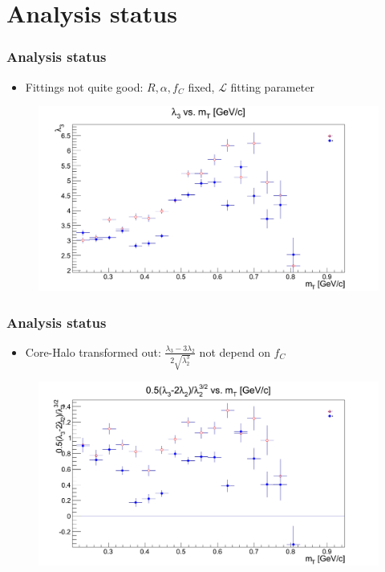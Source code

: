 \documentclass{beamer}
\begin{document}
\section{Analysis status}

\begin{frame}
\frametitle{Analysis status}
\begin{itemize}
\item Fittings not quite good: $R, \alpha, f_C$ fixed, $\mathcal{L}$ fitting parameter
\end{itemize}
\begin{figure}
\includegraphics[scale=0.27]{pic/l3}
\end{figure}
\end{frame}

\begin{frame}
\frametitle{Analysis status}
\begin{itemize}
\item Core-Halo transformed out: $\frac{\lambda_3-3\lambda_2}{2\sqrt{\lambda_2^3}}$ not depend on $f_C$
\end{itemize}
\begin{figure}
\includegraphics[scale=0.25]{pic/l4}
\end{figure}
\end{frame}
\end{document}
